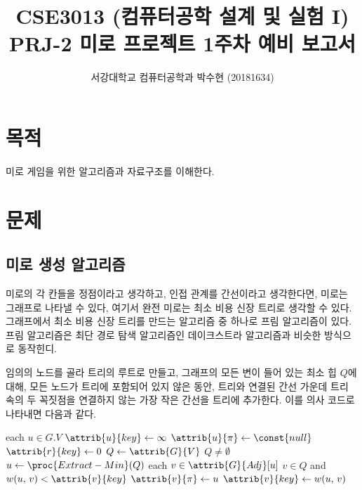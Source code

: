 
	


\title{CSE3013 (컴퓨터공학 설계 및 실험 I) \space \newline PRJ-2 미로 프로젝트 1주차 예비 보고서}
\author{서강대학교 컴퓨터공학과 박수현 (20181634)}
\maketitle

\section{목적}
미로 게임을 위한 알고리즘과 자료구조를 이해한다.

\section{문제}
\subsection{미로 생성 알고리즘}

미로의 각 칸들을 정점이라고 생각하고, 인접 관계를 간선이라고 생각한다면, 미로는 그래프로 나타낼 수 있다, 여기서 완전 미로는
최소 비용 신장 트리로 생각할 수 있다. 그래프에서 최소 비용 신장 트리를 만드는
알고리즘 중 하나로 프림 알고리즘이 있다.
프림 알고리즘은 최단 경로 탐색 알고리즘인 데이크스트라 알고리즘과 비슷한
방식으로 동작힌디.

임의의 노드를 골라 트리의 루트로 만들고, 그래프의 모든 변이 들어 있는 최소 힙 $Q$에 대해,
모든 노드가 트리에 포함되어 있지 않은 동안, 트리와 연결된 간선 가운데 트리 속의 두 꼭짓점을 연결하지 않는 가장 작은 간선을 트리에 추가한다.
이를 의사 코드로 나타내면 다음과 같다.

\begin{codebox}
\li \For each $u \in G.V$ \Do
\li     $\attrib{u}{key} \gets \infty$
\li     $\attrib{u}{\pi} \gets \const{null}$
    \End
\li $\attrib{r}{key} \gets 0$
\li $Q \gets \attrib{G}{V}$
\li \While $Q \neq \emptyset$ \Do
\li     $u \gets \proc{Extract-Min}(Q)$
\li     \For each $v \in \attrib{G}{Adj}[u]$ \Do
\li         \If $v \in Q$ and $w(u,\,v) < \attrib{v}{key}$ \Then
\li             $\attrib{v}{\pi} \gets u$
\li             $\attrib{v}{key} \gets w(u,\,v)$
            \End
        \End
    \End
\end{codebox}

